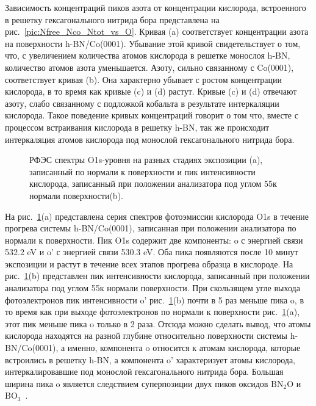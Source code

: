 Зависимость концентраций пиков азота от концентрации кислорода, встроенного в решетку гексагонального нитрида бора
представлена на рис.~\ref{pic:Nfree_Nco_Ntot_vs_O}. Кривая (a) соответствует концентрации азота на поверхности
h-BN/Co(0001). Убывание этой кривой свидетельствует о том, что, с увеличением количества атомов кислорода в решетке монослоя h-BN,
количество атомов азота уменьшается. Азоту, сильно связанному с Co(0001), соответствует 
кривая (b). Она характерно убывает с ростом концентрации кислорода, в то время как кривые (c) и (d) растут. Кривые (c) и (d) отвечают азоту, слабо связанному с подложкой кобальта в результате интеркаляции кислорода. Такое поведение 
кривых концентраций говорит о том что, вместе с процессом встраивания кислорода в решетку h-BN, так же происходит интеркаляция атомов кислорода под монослой гексагонального нитрида бора.
	\begin{figure}[!ht]
		\caption{РФЭС спектры O1s-уровня на разных стадиях экспозиции (a), записанный по нормали к поверхности и пик интенсивности кислорода, записанный при положении анализатора под углом 55\degree к нормали поверхности(b).}
		\label{pic:O1s_all}
	\end{figure}
На рис.~\ref{pic:O1s_all}(a) представлена серия спектров фотоэмиссии кислорода O1s в течение прогрева системы 
h-BN/Co(0001), записанная при положении анализатора по нормали к поверхности. Пик O1s содержит две компоненты: o с энергией связи 532.2 eV и o' с энергией связи 530.3 eV. Оба пика появляются после 10 минут экспозиции и растут в течение всех этапов прогрева образца в кислороде. На рис.~\ref{pic:O1s_all}(b) представлен пик интенсивности кислорода, записанный при положении анализатора под углом 55\degree к нормали поверхности. При скользящем угле выхода фотоэлектронов пик интенсивности o' рис.~\ref{pic:O1s_all}(b) почти в 5 раз меньше пика o, в то время как при выходе фотоэлектронов по нормали к поверхности рис.~\ref{pic:O1s_all}(a), этот пик меньше пика o только в 2 раза. Отсюда можно сделать вывод, что атомы кислорода находятся на разной глубине относительно поверхности системы h-BN/Co(0001), а именно, компонента o относится к атомам кислорода, которые встроились в решетку h-BN, а компонента o' характеризует атомы кислорода, интеркалировавшие под монослой гексагонального нитрида бора. Большая ширина пика o является следствием суперпозиции двух пиков оксидов $\mathrm{BN_2O}$ и $\mathrm{BO_3}$~\cite{Shevelev2019_h-BN/Co_oxydation}. 




